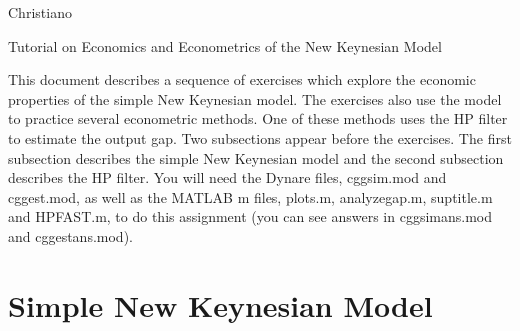 \documentclass[12pt,thmsa]{article}
\begin{document}
Christiano

\begin{center}
Tutorial on Economics and Econometrics of the New Keynesian Model
\end{center}

This document describes a sequence of exercises which explore the economic
properties of the simple New Keynesian model. The exercises also use the
model to practice several econometric methods. One of these methods uses the
HP filter to estimate the output gap. Two subsections appear before the
exercises. The first subsection describes the simple New Keynesian model and
the second subsection describes the HP filter. You will need the Dynare
files, cggsim.mod and cggest.mod, as well as the MATLAB m files, plots.m,
analyzegap.m, suptitle.m and HPFAST.m, to do this assignment (you can see
answers in cggsimans.mod and cggestans.mod).

\section{Simple New Keynesian Model}
\end{document}
